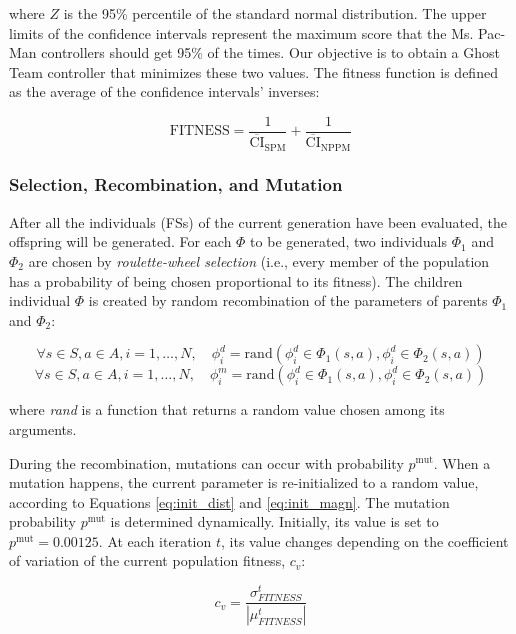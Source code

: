 \documentclass{llncs}
\begin{document}
where $Z$ is the 95\% percentile of the standard normal distribution. The upper limits of the confidence intervals represent the maximum score that the Ms. Pac-Man controllers should get 95\% of the times. Our objective is to obtain a Ghost Team controller that minimizes these two values. The fitness function is defined as the average of the confidence intervals' inverses:
\begin{small}
\begin{equation}
\mathrm{FITNESS} = \frac{1}{\overline{\mathrm{CI}}_\mathrm{SPM}} + \frac{1}{\overline{\mathrm{CI}}_\mathrm{NPPM}}
\end{equation}
\end{small}

\subsubsection{Selection, Recombination, and Mutation}
\label{subsubsec:GA_Selection_Recombination_Mutation}
After all the individuals (FSs) of the current generation have been evaluated, the offspring will be generated. For each $\Phi$ to be generated, two individuals $\Phi_1$ and $\Phi_2$ are chosen by \textit{roulette-wheel selection}  (i.e., every member of the population has a probability of being chosen proportional to its fitness). The children individual $\Phi$ is created by random recombination of the parameters of parents $\Phi_1$ and $\Phi_2$:
\begin{small}
\begin{equation}
\forall s \in S, a \in A,  i = 1, \ldots, N, \quad \phi^d_i  = \mathrm{rand}(\phi^d_i \in \Phi_1(s,a), \phi^d_i \in \Phi_2(s,a))
\end{equation}
\begin{equation}
\forall s \in S, a \in A,  i = 1, \ldots, N, \quad \phi^m_i = \mathrm{rand}(\phi^d_i \in \Phi_1(s,a), \phi^d_i \in \Phi_2(s,a))
\end{equation}
\end{small}
where \textit{rand} is a function that returns a random value chosen
among its arguments.

During the recombination, mutations can occur
with probability $p^\mathrm{mut}$. When a mutation happens, the
current parameter is re-initialized to a random value, according to
Equations \ref{eq:init_dist} and \ref{eq:init_magn}.
The mutation probability $p^\mathrm{mut}$ is determined
dynamically. Initially, its value is set to $p^\mathrm{mut} =
0.00125$. At each iteration $t$, its value changes depending on the
coefficient of variation of the current population fitness, $c_v$:
\begin{small}
\begin{equation}
c_v = \frac{\sigma^t_{FITNESS}}{|\mu^t_{FITNESS}|}
\end{equation}
\end{small}
\end{document}
